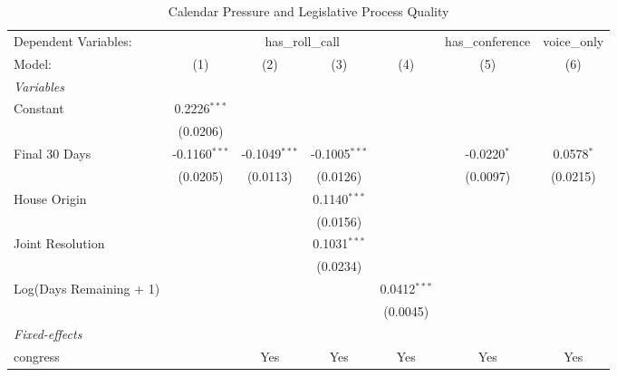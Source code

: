 
\begin{table}[htbp]
   \caption{\label{tab:main} Calendar Pressure and Legislative Process Quality}
   \centering
   \small
   \begin{adjustbox}{max width=\textwidth}
   \begin{tabular}{lcccccc}
      \tabularnewline \midrule \midrule
      Dependent Variables: & \multicolumn{4}{c}{has\_roll\_call} & has\_conference & voice\_only\\
      Model:                  & (1)             & (2)             & (3)             & (4)            & (5)           & (6)\\  
      \midrule
      \emph{Variables}\\
      Constant                & 0.2226$^{***}$  &                 &                 &                &               &   \\   
                              & (0.0206)        &                 &                 &                &               &   \\   
      Final 30 Days           & -0.1160$^{***}$ & -0.1049$^{***}$ & -0.1005$^{***}$ &                & -0.0220$^{*}$ & 0.0578$^{*}$\\   
                              & (0.0205)        & (0.0113)        & (0.0126)        &                & (0.0097)      & (0.0215)\\   
      House Origin            &                 &                 & 0.1140$^{***}$  &                &               &   \\   
                              &                 &                 & (0.0156)        &                &               &   \\   
      Joint Resolution        &                 &                 & 0.1031$^{***}$  &                &               &   \\   
                              &                 &                 & (0.0234)        &                &               &   \\   
      Log(Days Remaining + 1) &                 &                 &                 & 0.0412$^{***}$ &               &   \\   
                              &                 &                 &                 & (0.0045)       &               &   \\   
      \midrule
      \emph{Fixed-effects}\\
      congress                &                 & Yes             & Yes             & Yes            & Yes           & Yes\\  

\end{tabular}
\end{adjustbox}
\end{table}
